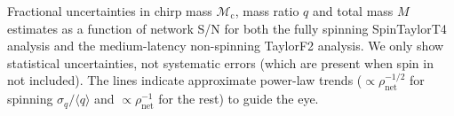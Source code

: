 \label{fig:Mc_q_std_snr} Fractional uncertainties in chirp mass $\mathcal{M}_\mathrm{c}$, mass ratio $q$ and total mass $M$ estimates as a function of network S/N for both the fully spinning SpinTaylorT4 analysis and the medium-latency non-spinning TaylorF2 analysis. We only show statistical uncertainties, not systematic errors (which are present when spin in not included). The lines indicate approximate power-law trends ($\propto \rho_\mathrm{net}^{-1/2}$ for spinning $\sigma_q/\langle q\rangle$ and $\propto \rho_\mathrm{net}^{-1}$ for the rest) to guide the eye.
  
  
  